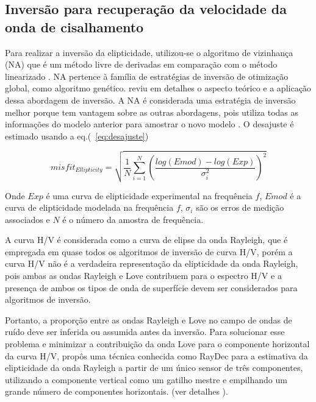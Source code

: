 \documentclass[smallextended]{svjour3}       %
\begin{document}
\subsection{Inversão para recuperação da velocidade da onda de cisalhamento}

Para realizar a inversão da elipticidade, utilizou-se o algoritmo de vizinhança (NA) \citep{wathelet2008array} que é um método livre de derivadas em comparação com o método linearizado \citep{menke1989geophysical}. NA pertence à família de estratégias de inversão de otimização global, como algoritmo genético. \cite{sambridge2002monte} reviu em detalhes o aspecto teórico e a aplicação dessa abordagem de inversão. A NA é considerada uma estratégia de inversão melhor porque tem vantagem sobre as outras abordagens, pois utiliza todas as informações do modelo anterior para amostrar o novo modelo \citep{sambridge1999geophysical}. O desajuste é estimado usando a eq.(~\ref{eq:desajuste})  

\begin{equation}\label{eq:desajuste}
  misfit_{Ellipticity} = \sqrt{\frac{1}{N} \sum_{i=1}^{N}\left(\frac{log(Emod) - log(Exp)}{\sigma_i^2}\right)^2} 
\end{equation}

Onde $Exp$ é uma curva de elipticidade experimental na frequência $f$, $Emod$ é a curva de elipticidade modelada na frequência $f$, $\sigma_i$ são os erros de medição associados e $N$ é o número da amostra de frequência.

A curva H/V é considerada como a curva de elipse da onda Rayleigh, que é empregada em quase todos os algoritmos de inversão de curva H/V, porém a curva H/V não é a verdadeira representação da elipticidade da onda Rayleigh, pois ambas as ondas Rayleigh e Love contribuem para o espectro H/V \citep{bonnefoy2006h} e a presença de ambos os tipos de onda de superfície devem ser considerados para algoritmos de inversão. 

Portanto, a proporção entre as ondas Rayleigh e Love no campo de ondas de ruído deve ser inferida ou assumida antes da inversão. Para solucionar esse problema e minimizar a contribuição da onda Love para o componente horizontal da curva H/V, \cite{hobiger2009single} propôs uma técnica conhecida como RayDec para a estimativa da elipticidade da onda Rayleigh a partir de um único sensor de três componentes, utilizando a componente vertical como um gatilho mestre e empilhando um grande número de componentes horizontais. (ver detalhes \citealp{hobiger2009single}). 
\end{document}
